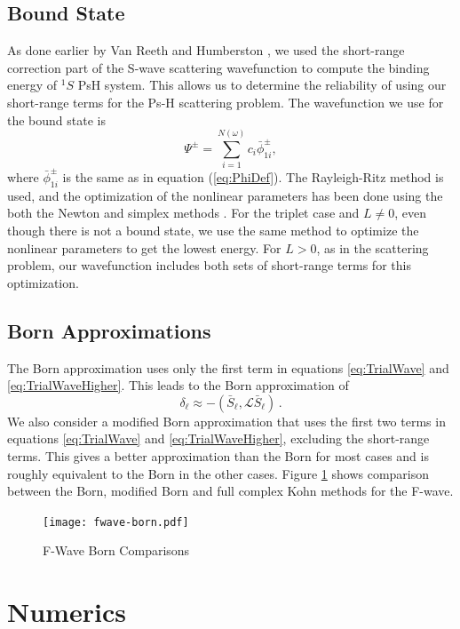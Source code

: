 \documentclass[preprint,showpacs,preprintnumbers,amsmath,amssymb]{revtex4}
\newcommand{\todoi}{\todo[inline]}
\begin{document}
\subsection{Bound State}
As done earlier by Van Reeth and Humberston \cite{VanReeth2003,VanReeth2004}, we used the short-range correction part of the S-wave scattering wavefunction to compute the binding energy of $^1S$ PsH system. This allows us to determine the reliability of using our short-range terms for the Ps-H scattering problem. The wavefunction we use for the bound state is
\begin{equation}
\label{eq:BoundWavefn}
\Psi^\pm = \sum_{i=1}^{N(\omega)} c_i \bar{\phi}_{1i}^\pm,
\end{equation}
where $\bar{\phi}_{1i}^\pm$ is the same as in equation (\ref{eq:PhiDef}). The Rayleigh-Ritz method is used, and the optimization of the nonlinear parameters has been done using the both the Newton and simplex methods \cite{Yan1999,GSL}. For the triplet case and $L \neq 0$, even though there is not a bound state, we use the same method to optimize the nonlinear parameters to get the lowest energy. For $L > 0$, as in the scattering problem, our wavefunction includes both sets of short-range terms for this optimization.


\subsection{Born Approximations}
The Born approximation \cite{?} uses only the first term in equations \ref{eq:TrialWave} and \ref{eq:TrialWaveHigher}. This leads to the Born approximation of
\begin{equation}
\label{eq:Born}
\delta_\ell \approx -\left(\bar{S}_\ell,\mathcal{L}\bar{S}_\ell \right)\, .
\end{equation}
We also consider a modified Born approximation that uses the first two terms in equations \ref{eq:TrialWave} and \ref{eq:TrialWaveHigher}, excluding the short-range terms. This gives a better approximation than the Born for most cases and is roughly equivalent to the Born in the other cases. Figure \ref{fig:fwave-born.pdf} shows comparison between the Born, modified Born and full complex Kohn methods for the F-wave.
\begin{figure}[ht]
	\centering
	\texttt{[image: fwave-born.pdf]}
	\caption{F-Wave Born Comparisons}
	\label{fig:fwave-born.pdf}
\end{figure}




\section{Numerics}
\label{sec:Numerical}
\end{document}
